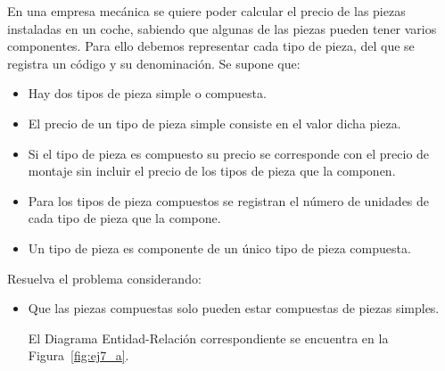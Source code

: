 \begin{ejercicio} \label{ej:7}
    En una empresa mecánica se quiere poder calcular el precio de las piezas instaladas en un coche, sabiendo
    que algunas de las piezas pueden tener varios componentes. Para ello debemos representar cada tipo de
    pieza, del que se registra un código y su denominación. Se supone que:
    \begin{itemize}
        \item Hay dos tipos de pieza simple o compuesta.
        \item El precio de un tipo de pieza simple consiste en el valor dicha pieza.
        \item Si el tipo de pieza es compuesto su precio se corresponde con el precio de montaje sin incluir el precio de
        los tipos de pieza que la componen.
        \item Para los tipos de pieza compuestos se registran el número de unidades de cada tipo de pieza que la
        compone.
        \item Un tipo de pieza es componente de un único tipo de pieza compuesta.
    \end{itemize}
    Resuelva el problema considerando:
    \begin{itemize}
        \item Que las piezas compuestas solo pueden estar compuestas de piezas simples.
        
        El Diagrama Entidad-Relación correspondiente se encuentra en la Figura~\ref{fig:ej7_a}.
        \begin{figure}
            \centering
\end{figure}
\end{itemize}
\end{ejercicio}
